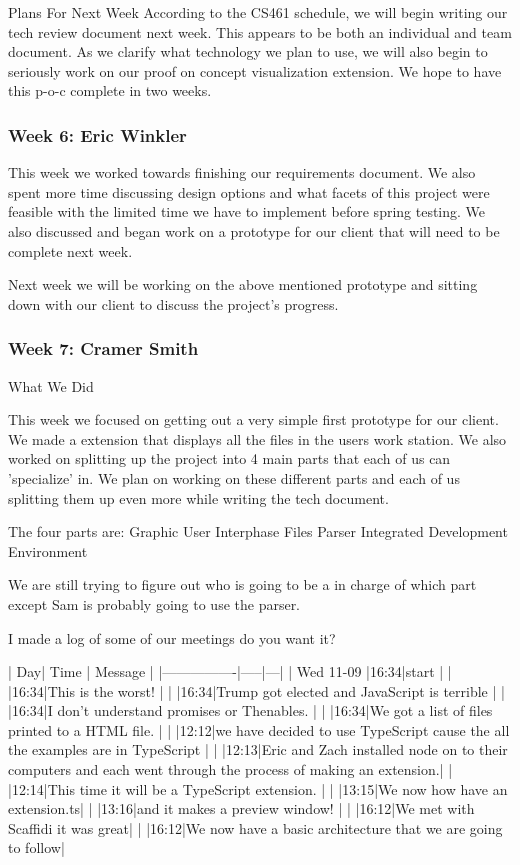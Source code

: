 Plans For Next Week
According to the CS461 schedule, we will begin writing our tech review document next week. This appears to be both an individual and team document. As we clarify what technology we plan to use, we will also begin to seriously work on our proof on concept visualization extension. We hope to have this p-o-c complete in two weeks.

\subsubsection{Week 6: Eric Winkler}

This week we worked towards finishing our requirements document. We also spent more time discussing design options and what facets of this project were feasible with the limited time we have to implement before spring testing. We also discussed and began work on a prototype for our client that will need to be complete next week.

Next week we will be working on the above mentioned prototype and sitting down with our client to discuss the project's  progress.

\subsubsection{Week 7: Cramer Smith}

What We Did

This week we focused on getting out a very simple first prototype for our client. We made a extension that displays all the files in the users work station. We also worked on splitting up the project into 4 main parts that each of us can 'specialize' in. We plan on working on these different parts and each of us splitting them up even more while writing the tech document. 

The four parts are:
  Graphic User Interphase
  Files
  Parser
  Integrated Development Environment

We are still trying to figure out who is going to be a in charge of which part except Sam is probably going to use the parser.

I made a log of some of our meetings do you want it? 

| Day| Time    | Message  |
|----------------|-----|---|
|   Wed 11-09 |16:34|start                                            |
|               |16:34|This is the worst!   |
|               |16:34|Trump got elected and JavaScript is terrible   |
|               |16:34|I don't understand promises or Thenables.    |
|           |16:34|We got a list of files printed to a HTML file.   |
|             |12:12|we have decided to use TypeScript cause the all the examples are in TypeScript          |
|                |12:13|Eric and Zach installed node on to their computers and each went through the process of making an extension.|
|                |12:14|This time it will be a TypeScript extension. |
|                |13:15|We now how have an extension.ts|
|                |13:16|and it makes a preview window! |
|                |16:12|We met with Scaffidi it was great|
|                |16:12|We now have a basic architecture that we are going to follow|


